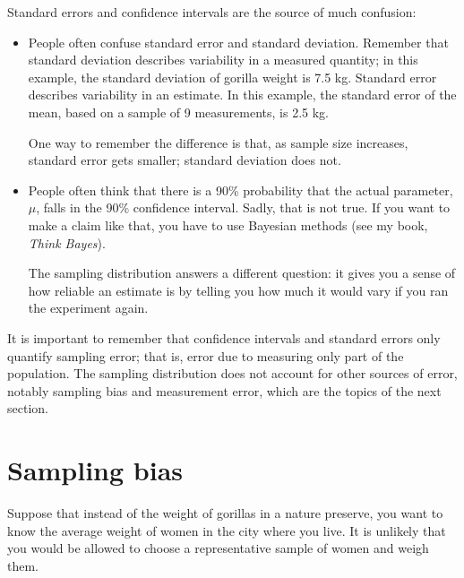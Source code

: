 \documentclass[12pt]{book}
\theoremstyle{exercise}
\begin{document}
Standard errors and confidence intervals are the source of much confusion:

\begin{itemize}

\item People often confuse standard error and standard deviation.
  Remember that standard deviation describes variability in a measured
  quantity; in this example, the standard deviation of gorilla weight
  is 7.5 kg.  Standard error describes variability in an estimate.  In
  this example, the standard error of the mean, based on a sample of 9
  measurements, is 2.5 kg.%
%

  One way to remember the difference is that, as sample size
  increases, standard error gets smaller; standard deviation does not.

\item People often think that there is a 90\% probability that the
  actual parameter, $\mu$, falls in the 90\% confidence interval.
  Sadly, that is not true.  If you want to make a claim like that, you
  have to use Bayesian methods (see my book, {\it Think Bayes\/}).%

  The sampling distribution answers a different question: it gives you
  a sense of how reliable an estimate is by telling you how much it
  would vary if you ran the experiment again.%

\end{itemize}

It is important to remember that confidence intervals
and standard errors only quantify sampling error; that is,
error due to measuring only part of the population.
The sampling distribution does not account for other
sources of error, notably sampling bias and measurement error, 
which are the topics of the next section.


\section{Sampling bias}

Suppose that instead of the weight of gorillas in a nature preserve,
you want to know the average weight of women in the city where you
live.  It is unlikely that you would be allowed
to choose a representative sample of women and
weigh them.%
%
%
%
%
\end{document}

